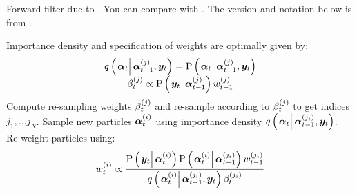 \begin{algorithm}
\caption{Forward filter due to \cite{pitt99}. You can compare with \citet[page 20 and 25]{doucet09}. The version and notation below is from \citet[page 449]{fearnhead10}.}\label{alg:forward}
\begin{algorithmic}[1]\raggedright
\INPUT
\State Importance density and specification of weights are optimally given by: 
\Statex \begin{equation}\begin{matrix}
	\IDC{\vec{\alpha}_t}{\partic{\vec{\alpha}}{t-1}{j}, \vec{y}_t} = \propC{\vec{\alpha}_t}{\partic{\vec{\alpha}}{t-1}{j}, \vec{y}_t} \\
	\partic{\beta}{t}{j} \propto \propC{\vec{y}_t}{\partic{\vec{\alpha}}{t-1}{j}}\partic{w}{t-1}{j}
\end{matrix}\end{equation}
\State Compute re-sampling weights $\beta_{t}^{\left( j\right)}$ and re-sample according to $\beta_{t}^{\left( j\right)}$ to get indices $j_1,\dots j_N$.
\EndProcedure
%
\State Sample new particles $\bm{\alpha}_{t}^{\left( i\right)}$ using importance density $\IDC{\vec{\alpha}_t}{\partic{\vec{\alpha}}{t-1}{j_i}, \vec{y}_t}$.
\EndProcedure
%
\State Re-weight particles using:
\StateX \begin{equation}\label{eqn:forwardWeight}
	\partic{w}{t}{i} \propto \frac{
		\propC{\vec{y}_t}{\partic{\vec{\alpha}}{t}{i}}
		\propC{\partic{\vec{\alpha}}{t}{i}}{\partic{\vec{\alpha}}{t-1}{j_i}}
		\partic{w}{t-1}{j_i}
	}{ %
		\IDC{\partic{\vec{\alpha}}{t}{i}}{\partic{\vec{\alpha}}{t-1}{j_i}, \vec{y}_t}
		\partic{\beta}{t}{j_i}
	}
\end{equation}
\EndProcedure
\EndFor
\end{algorithmic}
\end{algorithm}



